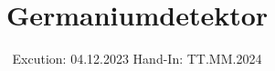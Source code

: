 

\subject{V18}
\title{Germaniumdetektor}
\date{%
  Excution: 04.12.2023
  \hspace{3em}
  Hand-In: TT.MM.2024
}



\maketitle
\setcounter{page}{1}







\printbibliography{}


